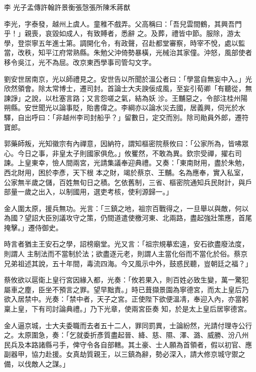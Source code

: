 
\begin{pinyinscope}

 李
 光子孟傳許翰許景衡張愨張所陳禾蔣猷



 李光，字泰發，越州上虞人。童稚不戲弄。父高稱曰：「吾兒雲間鶴，其興吾門乎！」親喪，哀毀如成人，有致賻者，悉辭
 之。及葬，禮皆中節。服除，游太學，登崇寧五年進士第。調開化令，有政聲，召赴都堂審察，時宰不悅，處以監當，改秩，知平江府常熟縣。朱勉父沖倚勢暴橫，光械治其家僮。沖怒，風部使者移令吳江，光不為屈。改京東西學事司管勾文字。



 劉安世居南京，光以師禮見之。安世告以所聞於溫公者曰：「學當自無妄中入。」光欣然領會。除太常博士，遷司封。首論士大夫諛佞成風，至妄引荀卿「有聽從，無諫諍」之說，以杜塞言路；又言怨嗟之氣，結為妖
 沴。王黼惡之，令部注桂州陽朔縣。安世聞光以論事貶，貽書偉之。李綱亦以論水災去國，居義興，伺光於水驛，自出呼曰：「非越州李司封船乎？」留數日，定交而別。除司勛員外郎，遷符寶郎。



 郭藥師叛，光知徽宗有內禪意，因納符，謂知樞密院蔡攸曰：「公家所為，皆咈眾心。今日之事，非皇太子則國家俱危。」攸矍然，不敢為異。欽宗受禪，擢右司諫。上皇東幸，憸人間兩宮，光請集議奉迎典禮。又奏：「東南財用，盡於朱勉，西北財用，困於李彥，天下根
 本之財，竭於蔡京、王黼。名為應奉，實入私室，公家無半歲之儲，百姓無旬日之積。乞依舊制，三省、樞密院通知兵民財計，與戶部量一歲之出入，以制國用，選吏考核，使利源歸一。」



 金人圍太原，援兵無功。光言：「三鎮之地，祖宗百戰得之，一旦舉以與敵，何以為國？望詔大臣別議攻守之策，仍間道遣使檄河東、北兩路，盡起強壯策應，首尾掩擊。」遷侍御史。



 時言者猶主王安石之學，詔榜廟堂。光又言：「祖宗規摹宏遠，安石欲盡廢法度，則謂人
 主制法而不當制於法；欲盡逐元老，則謂人主當化俗而不當化於俗。蔡京兄弟祖述其說，五十年間，毒流四海。今又風示中外，鼓惑民聽，豈朝廷之福？」



 蔡攸欲以扈衛上皇行宮因緣入都，光奏：「攸若果入，則百姓必致生變，萬一驚犯屬車之塵，臣坐不預言之罪。望早黜責。」時已葺擷景園為寧德宮，而太上皇后乃欲入居禁中。光奏：「禁中者，天子之宮。正使陛下欲便溫凊，奉迎入內，亦當躬稟上皇，下有司討論典禮。」乃下光章，使兩宮臣奏
 知，於是太上皇后居寧德宮。



 金人逼京城，士大夫委職而去者五十二人，罪同罰異，士論紛然，光請付理寺公行之。太原圍急，奏：「乞就委折彥質盡起晉、絳、慈、隰、澤、潞、威勝、汾八州民兵及本路諸縣弓手，俾守令各自部轄。其土豪、士人願為首領者，假以初官、應副器甲，協力赴援。女真劫質親王，以三鎮為辭，勢必深入，請大修京城守禦之備，以伐敵人之謀。」




\end{pinyinscope}
